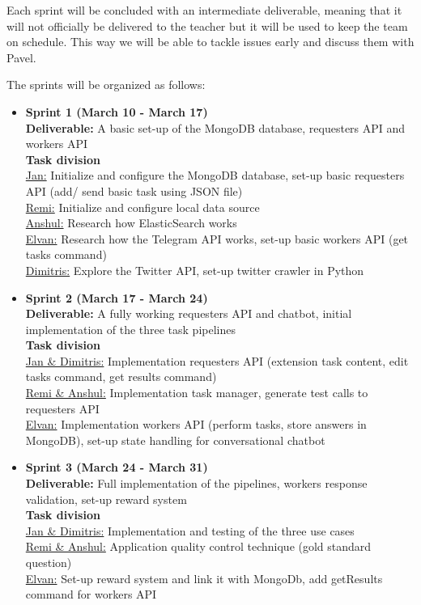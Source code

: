\documentclass[a4paper,dutch,fleqn]{exam}
\begin{document}
Each sprint will be concluded with an intermediate deliverable, meaning that it will not officially be delivered to the teacher but it will be used to keep the team on schedule. This way we will be able to tackle issues early and discuss them with Pavel.

The sprints will be organized as follows:

\begin{itemize}
\item \textbf{Sprint 1 (March 10  - March 17)} \\
\textbf{Deliverable:} A basic set-up of the MongoDB database, requesters API and workers API \\

\textbf{Task division} \\
\underline{Jan:} Initialize and configure the MongoDB database, set-up basic requesters API (add/ send basic task using JSON file) \\
\underline{Remi:} Initialize and configure local data source \\
\underline{Anshul:} Research how ElasticSearch works \\
\underline{Elvan:} Research how the Telegram API works, set-up basic workers API (get tasks command) \\
\underline{Dimitris:} Explore the Twitter API, set-up twitter crawler in Python

\item \textbf{Sprint 2 (March 17 -  March 24)} \\
\textbf{Deliverable:} A fully working requesters API and chatbot, initial implementation of the three task pipelines \\

\textbf{Task division} \\
\underline{Jan \& Dimitris:} Implementation requesters API (extension task content, edit tasks command, get results command) \\
\underline{Remi \& Anshul:} Implementation task manager, generate test calls to requesters API \\
\underline{Elvan:} Implementation workers API (perform tasks, store answers in MongoDB), set-up state handling for conversational chatbot

\item \textbf{Sprint 3 (March 24 - March 31)} \\
\textbf{Deliverable:} Full implementation of the pipelines, workers response validation, set-up reward system \\
\textbf{Task division} \\
\underline{Jan \& Dimitris:} Implementation and testing of the three use cases \\
\underline{Remi \& Anshul:} Application quality control technique (gold standard question) \\
\underline{Elvan:} Set-up reward system and link it with MongoDb, add getResults command for workers API \\


\end{itemize}
\end{document}
